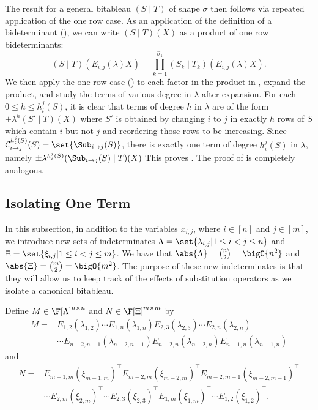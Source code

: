 \documentclass[letterpaper, 11pt]{amsart}
\begin{document}
\begin{pf}
    The result for a general bitableau $(S \mid T)$ of shape $\sigma$ then follows via repeated application of the one row case.
    As an application of the definition of a bideterminant (), we can write $(S \mid T)(X)$ as a product of one row bideterminants:
    \begin{equation}\label{eq:Eij_left_each_row}
        (S \mid T)(E_{i, j}(\lambda)X) = \prod_{k = 1}^{\widehat{\sigma}_1} (S_k \mid T_k)(E_{i, j}(\lambda)X).
    \end{equation}
    We then apply the one row case () to each factor in the product in , expand the product, and study the terms of various degree in $\lambda$ after expansion.
    For each $0 \leq h \leq h_{i}^{j}(S)$, it is clear that terms of degree $h$ in $\lambda$ are of the form $\pm\lambda^{h}(S' \mid T)(X)$ where $S'$ is obtained by changing $i$ to $j$ in exactly $h$ rows of $S$ which contain $i$ but not $j$ and reordering those rows to be increasing.
    Since $\mathcal{C}^{h_{i}^{j}(S)}_{i \to j}(S) = \set{\Sub_{i \to j}(S)}$, there is exactly one term of degree $h_{i}^{j}(S)$ in $\lambda$, namely $\pm \lambda^{h_{i}^{j}(S)} (\Sub_{i \to j}(S) \mid T)(X)$
    This proves .
    The proof of  is completely analogous.
\end{pf}

\subsection{Isolating One Term}\label{sec:extract_det}  

In this subsection, in addition to the variables $x_{i,j}$, where $i\in [n]$ and $j\in [m]$, we introduce new sets of indeterminates $\Lambda = \set{\lambda_{i, j} | 1 \leq i < j \leq n}$ and $\Xi = \set{\xi_{i, j} | 1 \leq i < j \leq m}$.
We have that $\abs{\Lambda} = \binom{n}{2} = \bigO{n^2}$ and $\abs{\Xi} = \binom{m}{2} = \bigO{m^2}$.
The purpose of these new indeterminates is that they will allow us to keep track of the effects of substitution operators as we isolate a canonical bitableau.

Define $M \in \F[\Lambda]^{n\times n}$ and $N \in \F[\Xi]^{m\times m}$ by
\begin{align*}
M ={}& E_{1, 2}(\lambda_{1, 2}) \cdots E_{1, n}(\lambda_{1, n}) E_{2, 3}(\lambda_{2, 3}) \cdots E_{2, n}(\lambda_{2, n}) \\ 
&\cdots E_{n - 2, n - 1}(\lambda_{n - 2, n - 1}) E_{n - 2, n}(\lambda_{n - 2, n}) E_{n - 1, n}(\lambda_{n - 1, n})
\end{align*}
and
\begin{align*}
N ={}& E_{m - 1, m}(\xi_{m - 1, m})^{\top} E_{m - 2, m}(\xi_{m - 2, m})^\top E_{m - 2, m - 1}(\xi_{m - 2, m - 1})^\top \\ &
\cdots E_{2, m}(\xi_{2, m})^{\top} \cdots E_{2, 3}(\xi_{2, 3})^\top E_{1, m}(\xi_{1, m})^\top \cdots E_{1, 2}(\xi_{1, 2})^\top.
\end{align*}
\end{document}
